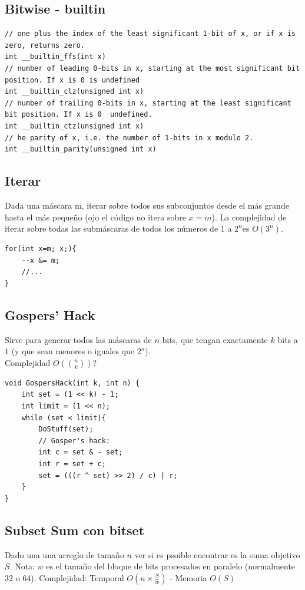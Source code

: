 \documentclass[10pt,spanish,mexico]{article}
\numberwithin{equation}{section}
\newcommand{\pa}[1]{\left( #1 \right)}
\begin{document}
\begin{multicols}{2}
\vspace{-1.2\baselineskip}
\hrulefill
\subsection{Bitwise - builtin}
\begin{verbatim}
// one plus the index of the least significant 1-bit of x, or if x is zero, returns zero.
int __builtin_ffs(int x)
// number of leading 0-bits in x, starting at the most significant bit position. If x is 0 is undefined
int __builtin_clz(unsigned int x)
// number of trailing 0-bits in x, starting at the least significant bit position. If x is 0  undefined.
int __builtin_ctz(unsigned int x)
// he parity of x, i.e. the number of 1-bits in x modulo 2.
int __builtin_parity(unsigned int x)
\end{verbatim}

\vspace{-1.2\baselineskip}
\hrulefill
\subsection{Iterar}
Dada una máscara m, iterar sobre todos sus subconjuntos desde el más grande hasta el más pequeño (ojo el código no itera sobre $x=m$). La complejidad de iterar sobre todas las submáscaras de todos los números de 1 a $2^n $es $O(3^n)$.
\begin{verbatim}
for(int x=m; x;){
    --x &= m;
    //...
}
\end{verbatim}

\vspace{-1.2\baselineskip}
\hrulefill
\subsection{Gospers’ Hack}
Sirve para generar todos las máscaras de $n$ bits, que tengan exactamente $k$ bits a $1$ (y que sean menores o iguales que $2^n$). \\
Complejidad $O\pa{\binom{n}{k}}$?
\begin{verbatim}
void GospersHack(int k, int n) {
    int set = (1 << k) - 1;
    int limit = (1 << n);
    while (set < limit){
        DoStuff(set);
        // Gosper's hack:
        int c = set & - set;
        int r = set + c;
        set = (((r ^ set) >> 2) / c) | r;
    }
}
\end{verbatim}

\vspace{-1.2\baselineskip}
\hrulefill
\subsection{Subset Sum con bitset}
Dado una una arreglo de tamaño \(n\) ver si es psoible encontrar es la suma objetivo  \(S\). Nota: \(w\) es el tamaño del bloque de bits procesados en paralelo (normalmente 32 o 64). Complejidad:  Temporal \(O\left(n \times \frac{S}{w}\right)\) -  Memoria \(O(S)\)


\end{multicols}
\end{document}
